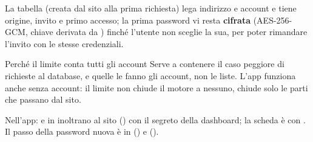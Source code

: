 \noindent
La tabella  (creata dal sito alla prima richiesta) lega
indirizzo e account e tiene origine, invito e primo accesso; la prima password
vi resta \textbf{cifrata} (AES-256-GCM, chiave derivata da
) finché l'utente non sceglie la sua, per poter
rimandare l'invito con le stesse credenziali.

\begin{perche}{Perché il limite conta tutti gli account}
Serve a contenere il caso peggiore di richieste al database, e quelle le
fanno gli account, non le liste. L'app funziona anche senza account: il
limite non chiude il motore a nessuno, chiude solo le parti che passano dal
sito.
\end{perche}

\noindent
Nell'app:  e
 in  inoltrano al sito
() con il segreto della dashboard; la scheda è
 con . Il passo della
password nuova è in  () e
 ().

